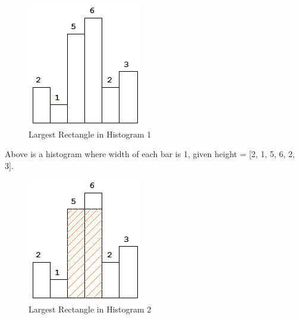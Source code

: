 \documentclass[12pt]{book}
\begin{document}
\begin{figure}[htb]
\centering
\includegraphics[width=.9\linewidth]{./pic/rectangle1.png}
\caption{Largest Rectangle in Histogram 1}
\end{figure}

Above is a histogram where width of each bar is 1, given height = [2, 1, 5, 6, 2, 3].

\begin{figure}[htb]
\centering
\includegraphics[width=.9\linewidth]{./pic/rectangle2.png}
\caption{Largest Rectangle in Histogram 2}
\end{figure}
\end{document}
